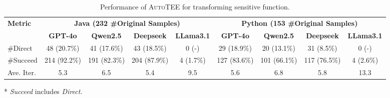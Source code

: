 \begin{table*}[htb]
\centering
\caption{Performance of \textsc{AutoTEE} for transforming sensitive function.}
\label{tab:eva:consistent}
\begin{threeparttable}
\begin{tabular}{lcccccccc}
\toprule[1.5pt]
\multirow{2}{*}{\textbf{Metric}} & \multicolumn{4}{c}{\textbf{Java (232 \#Original Samples)}} & \multicolumn{4}{c}{\textbf{Python (153 \#Original Samples)}} \\
\cmidrule(lr){2-5} \cmidrule(lr){6-9}
 & \textbf{GPT-4o} & \textbf{Qwen2.5} & \textbf{Deepseek} & \textbf{LLama3.1} & \textbf{GPT-4o} & \textbf{Qwen2.5} & \textbf{Deepseek} & \textbf{LLama3.1}\\
\midrule[0.8pt]
\#Direct  & 48 (20.7\%) & 41 (17.6\%) & 43 (18.5\%)  & 0 (-) & 29 (18.9\%) & 20 (13.1\%) & 31 (8.5\%) & 0 (-) \\
\#Succeed & 214 (92.2\%) & 191 (82.3\%) & 204 (87.9\%) & 4 (1.7\%) & 127 (83.6\%) & 101 (66.1\%) & 117 (76.5\%) & 4 (2.6\%)\\
Ave. Iter. & 5.3 & 6.5 &5.4 & 9.5 & 5.6  & 6.8 & 5.8 & 13.3 \\
\bottomrule[1.5pt]
\end{tabular}
\begin{tablenotes}
\small
\item [*] \textit{Succeed} includes \textit{Direct}.
\end{tablenotes}
\end{threeparttable}
\end{table*}
